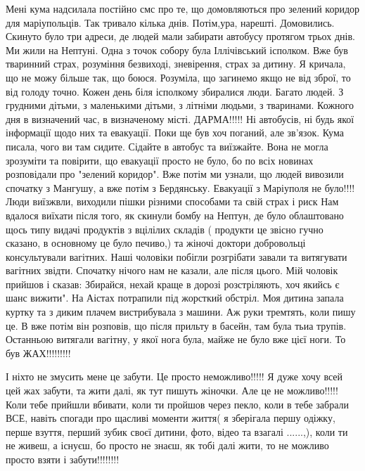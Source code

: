 
Мені кума надсилала постійно смс про те, що домовляються про зелений коридор
для маріупольців. Так тривало кілька днів. Потім,ура, нарешті. Домовились.
Скинуто було три адреси, де людей мали забирати автобусу протягом трьох днів.
Ми жили на Нептуні. Одна з точок собору була Іллічівський ісполком. Вже був
тваринний страх, розуміння безвиході, зневірення, страх за дитину. Я кричала,
що не можу більше так, що боюся. Розуміла, що загинемо якщо не від зброї, то
від голоду точно. Кожен день біля ісполкому збиралися люди. Багато людей. З
грудними дітьми, з маленькими дітьми, з літніми людьми, з тваринами. Кожного
дня в визначений час, в визначеному місті. ДАРМА!!!!! Ні автобусів, ні будь
якої інформації щодо них та евакуації. Поки ще був хоч поганий, але зв'язок.
Кума писала, чого ви там сидите. Сідайте в автобус та виїзжайте. Вона не могла
зрозуміти та повірити, що евакуації просто не було, бо по всіх новинах
розповідали про "зелений коридор". Вже потім ми узнали, що людей вивозили
спочатку з Мангушу, а вже потім з Бердянську. Евакуації з Маріуполя не було!!!!
Люди виїзжвли, виходили пішки різними способами та свій страх і риск Нам
вдалося виїхати після того, як скинули бомбу на Нептун, де було облаштовано
щось типу видачі продуктів з вцілілих складів ( продукти це звісно гучно
сказано, в основному це було печиво,) та жіночі доктори добровольці
консультували вагітних. Наші чоловіки побігли розгрібати завали та витягувати
вагітних звідти. Спочатку нічого нам не казали, але після цього. Мій чоловік
прийшов і сказав: Збирайся, нехай краще в дорозі розстріляють, хоч якийсь є
шанс вижити". На Аістах потрапили під жорсткий обстріл. Моя дитина запала
куртку та з диким плачем вистрибувала з машини. Аж руки тремтять, коли пишу це.
В вже потім він розповів, що після прильту в басейн, там була тьиа трупів.
Останньою витягали вагітну, у якої нога була, майже не було вже цієї ноги. То
був ЖАХ!!!!!!!!!

І ніхто не змусить мене це забути. Це просто неможливо!!!!! Я дуже хочу всей
цей жах забути, та жити далі, як тут пишуть жіночки. Але це не можливо!!!!!
Коли тебе прийшли вбивати, коли ти пройшов через пекло, коли в тебе забрали
ВСЕ, навіть спогади про щасливі моменти життя( я зберігала першу одіжку, перше
взуття, перший зубик своєї дитини, фото, відео та взагалі ......,), коли ти не
живеш, а існуєш, бо просто не знаєш, як тобі далі жити, то не можливо просто
взяти і забути!!!!!!!!

